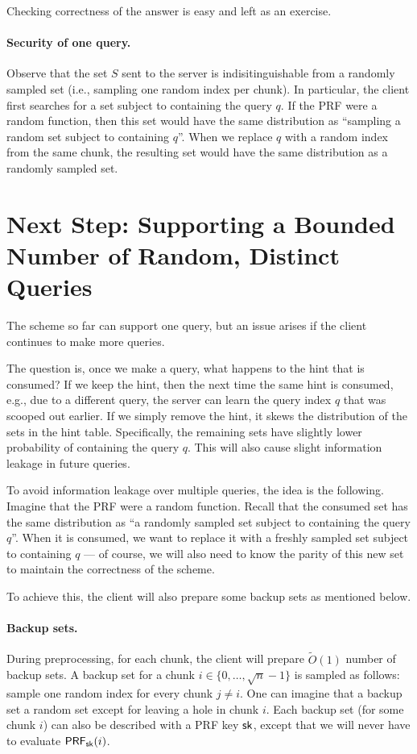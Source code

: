 Checking correctness of the answer is easy and left as an exercise.

\paragraph{Security of one query.}
Observe that the set $S$ sent to the server is indisitinguishable
from a randomly sampled set (i.e., sampling one random index per chunk).  
In particular, the client first searches for a set subject to containing the query $q$.
If the PRF were a random function, then this set would have the same distribution as
``sampling a random set subject to 
containing $q$''.
When we replace $q$ with 
a random index from the same chunk, the resulting set
would have the same distribution as a randomly sampled set.

\section{Next Step: Supporting a Bounded Number of Random, Distinct Queries}
The scheme so far can support one query, but 
an issue arises if the client continues to make more queries.

The question is, 
once we make a query, 
what happens to the hint that is consumed? 
If we keep the hint, then the next time the same hint
is consumed, e.g., due to a different query, the server  
can learn the query index $q$ that was scooped out earlier.  
If we simply remove the hint, it skews the distribution of the sets 
in the hint table.
Specifically, the remaining sets have slightly lower
probability of containing the query $q$. 
This will also cause slight information leakage 
in future queries.

To avoid information leakage over multiple queries, 
the idea is the following. 
Imagine that the PRF were a random function.
Recall that the consumed set has the same distribution
as ``a randomly sampled set subject to containing the query $q$''.
When it is consumed, 
we want to replace it with a freshly sampled
set subject to containing $q$ --- of course, we will also need to know the parity
of this new set to maintain the correctness of the scheme. 

To achieve this, the client will also prepare  
some backup sets as mentioned below.

\paragraph{Backup sets.}
During preprocessing, 
for each chunk, the client will prepare 
$\widetilde{O}(1)$ number of backup sets.
A backup
set for a chunk $i \in \{0, \ldots, \sqrt{n}-1\}$ 
is sampled as follows:
sample one random index 
for every chunk $j \neq i$.
One can imagine that 
a backup set a random set except for leaving a hole in chunk $i$.
Each backup set (for some chunk $i$) 
can also be described with a PRF key ${\sf sk}$, except that 
we will never have to evaluate ${\sf PRF}_{{\sf sk}}(i)$.


